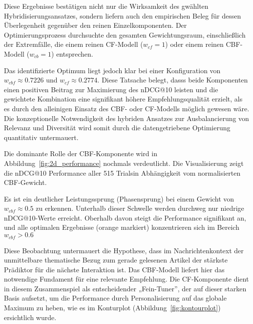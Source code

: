 Diese Ergebnisse bestätigen nicht nur die Wirksamkeit des gwählten
Hybridisierungsansatzes, sondern liefern auch den empirischen Beleg für dessen Überlegenheit gegenüber den reinen
Einzelkomponenten. Der Optimierungsprozess durchsuchte den gesamten Gewichtungsraum, einschließlich der Extremfälle,
die einem reinen \ac{CF}-Modell ($w_{cf} = 1$) oder einem reinen \ac{CBF}-Modell ($w_{cb} = 1$) entsprechen.

Das identifizierte Optimum liegt jedoch klar bei einer Konfiguration von \(w_{cbf} \approx 0.7226\) und
\(w_{cf} \approx 0.2774\). Diese Tatsache belegt, dasss beide Komponenten einen positiven Beitrag zur Maximierung
des \ac{nDCG}@10 leisten und die gewichtete Kombination eine signifikant höhere Empfehlungsqualität erzielt, als es durch den
alleinigen Einsatz des \ac{CBF}- oder \ac{CF}-Modells möglich gewesen wäre. Die konzeptionelle Notwendigkeit des hybriden
Ansatzes zur Ausbalancierung von Relevanz und Diversität wird somit durch die datengetriebene Optimierung quantitativ
untermauert.

Die dominante Rolle der \ac{CBF}-Komponente wird in Abbildung~\ref{fig:2d_performance} nochmals verdeutlicht. Die 
Visualisierung zeigt die \ac{nDCG}@10 Performance aller 515 Trialsin Abhängigkeit vom normalisierten \ac{CBF}-Gewicht.

Es ist ein deutlicher Leistungssprung (Phasensprung) bei einem Gewicht von \(w_{cbf} \approx 0.5\) zu erkennen.
Unterhalb dieser Schwelle werden durchweg nur niedrige \ac{nDCG}@10-Werte erreicht. Oberhalb davon steigt die Performance 
signifikant an, und alle optimalen Ergebnisse (orange markiert) konzentrieren sich im Bereich \(w_{cbf} > 0.6\)

Diese Beobachtung untermauert die Hypothese, dass im Nachrichtenkontext der unmittelbare thematische Bezug zum 
gerade gelesenen Artikel der stärkste Prädiktor für die nächste Interaktion ist. 
Das CBF-Modell liefert hier das notwendige Fundament für eine relevante Empfehlung. 
Die CF-Komponente dient in diesem Zusammenspiel als entscheidender „Fein-Tuner”, der auf dieser starken Basis aufsetzt, 
um die Performance durch Personalisierung auf das globale Maximum zu heben, wie es im Konturplot (Abbildung~\ref{fig:kontourplot}) 
ersichtlich wurde.


% 